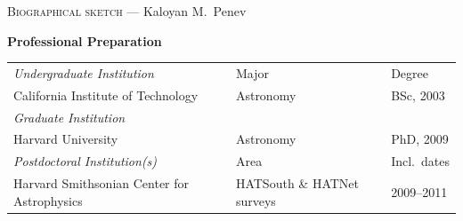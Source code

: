 \begin{center}
\large \textsc{Biographical sketch} --- Kaloyan M.~Penev
\end{center}
%
\vspace{-3mm}

%
{\bf \noindent Professional Preparation\\}
\vspace{-3mm}

\begin{tabular}{p{60mm}p{70mm}p{20mm}}
	\hline\hline
	{\em Undergraduate Institution}	&	Major	&	Degree\\
	California Institute of Technology	&
	Astronomy	&
	BSc, 2003\\
%
	{\em Graduate Institution}	&	&\\
	Harvard University	&
	Astronomy	&
	PhD, 2009\\
%
	{\em Postdoctoral Institution(s)}	&	Area & Incl.~dates\\
	Harvard Smithsonian Center for Astrophysics &
	HATSouth \& HATNet surveys	&
	2009\---2011\\
\hline

\end{tabular}

